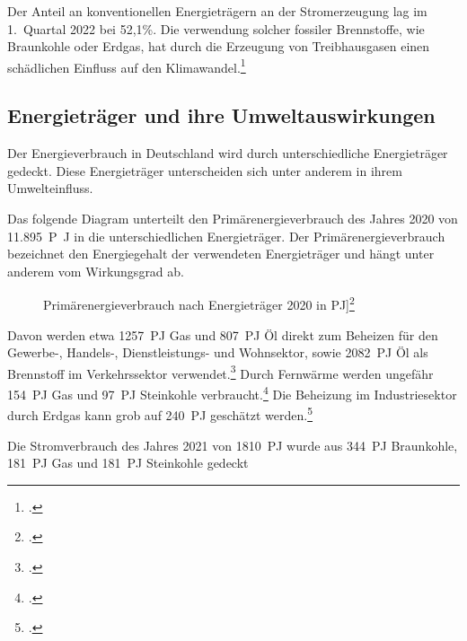 \documentclass[12pt]{article}
\begin{document}
    Der Anteil an konventionellen Energieträgern an der Stromerzeugung lag im 1.\ Quartal 2022 bei 52,1\%.
    Die verwendung solcher fossiler Brennstoffe, wie Braunkohle oder Erdgas, hat durch die Erzeugung von
    Treibhausgasen einen schädlichen Einfluss auf den Klimawandel.\footcite{wilkeErneuerbareUndKonventionelle2013}

    \subsection{Energieträger und ihre Umweltauswirkungen}
    Der Energieverbrauch in Deutschland wird durch unterschiedliche Energieträger gedeckt.
    Diese Energieträger unterscheiden sich unter anderem in ihrem Umwelteinfluss.

    Das folgende Diagram unterteilt den Primärenergieverbrauch des Jahres 2020 von
    \qty{11.895}{P\joule}
    in die unterschiedlichen Energieträger.
    Der Primärenergieverbrauch bezeichnet den Energiegehalt der verwendeten Energieträger und
    hängt unter anderem vom Wirkungsgrad ab.

    \begin{figure}[!h]
        \caption{Primärenergieverbrauch nach Energieträger 2020 in
        \unit{PJ}]\footcite{Energieflussbild2020PJLang}}
    \end{figure}

    Davon werden etwa \qty{1257}{PJ} Gas und \qty{807}{PJ} Öl direkt zum Beheizen für den Gewerbe-, Handels-,
    Dienstleistungs- und Wohnsektor, sowie \qty{2082}{PJ} Öl als Brennstoff im Verkehrssektor verwendet.\footcite{Energieflussbild2020PJLang}
    Durch Fernwärme werden ungefähr \qty{154}{PJ} Gas und \qty{97}{PJ} Steinkohle verbraucht.\footcite{WieKannTransformation}
    Die Beheizung im Industriesektor durch Erdgas kann grob auf \qty{240}{PJ} geschätzt werden.\footcite{Industrie}

    Die Stromverbrauch des Jahres 2021 von \qty{1810}{PJ} wurde aus \qty{344}{PJ} Braunkohle, \qty{181}{PJ} Gas
    und \qty{181}{PJ} Steinkohle gedeckt
\end{document}
